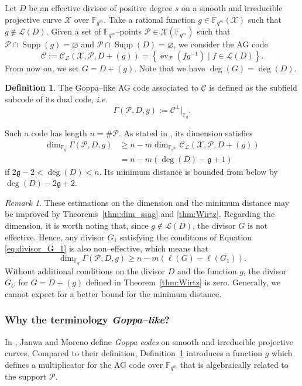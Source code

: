 \documentclass[journal]{IEEEtran}
\theoremstyle{plain}
\theoremstyle{definition}
\newtheorem{definition}[thm]{Definition}
\theoremstyle{remark}
\newtheorem{remark}[thm]{Remark}
\DeclareMathOperator{\ev}{ev}
\newcommand{\calP}{\mathcal{P}}
\newcommand{\calL}{\mathcal{L}}
\newcommand{\calC}{\mathcal{C}}
\newcommand{\calX}{\mathcal{X}}
\newcommand{\fqm}{\mathbb{F}_{q^m}}
\newcommand{\fq}{\mathbb{F}_{q}}
\newcommand{\set}[1]{\left\{#1\right\}}
\newcommand{\Supp}{\operatorname{Supp}}
\begin{document}
	Let $D$ be an effective divisor of positive degree $s$ on a smooth and irreducible projective curve $\calX$ over $\fqm$. Take a rational function $g \in \fqm(\calX)$ such that $g \notin \calL(D)$. Given a set of $\fqm$--points $\calP \in \calX(\fqm)$ such that $\calP \cap \Supp(g) = \varnothing$ and $\calP \cap \Supp(D) = \varnothing$, we consider the AG code
	\[\calC := \calC_{\calL}(\calX,\calP,D+(g))=\set{\ev_{\calP}(fg^{-1}) \mid f \in \calL(D)}.\]
	From now on, we set $G=D+(g)$. Note that we have $\deg(G)=\deg(D)$.
	\begin{definition} \label{def:Goppa--like_AG_code}
		The Goppa--like AG code associated to $\calC$ is defined as the subfield subcode of its dual code, \emph{i.e.}
		\[ \Gamma(\calP,D,g) := \calC^{\perp}|_{\fq}.\]
	\end{definition}%
	Such a code has length $n = \# \calP$. As stated in \cite[Theorem~1]{JM96}, its dimension satisfies 
	\[\begin{aligned}
		\dim_{\fq} \Gamma(\calP,D,g) 	&\geq n-m \dim_{\fqm} \calC_{\calL}(\calX,\calP,D+(g)) \\
										&=n-m(\deg (D) - \mathfrak{g} +1 )
	\end{aligned}\]
	if $2\mathfrak{g} - 2 < \deg (D) < n$. Its minimum distance is bounded from below by $\deg (D) - 2 \mathfrak{g} + 2$.
	
	\begin{remark}
		These estimations on the dimension and the minimum distance may be improved by Theorems~\ref{thm:dim_ssag} and \ref{thm:Wirtz}. Regarding the dimension, it is worth noting that, since $g \notin \calL(D)$, the divisor $G$ is not effective. Hence, any divisor $G_1$ satisfying the conditions of Equation \eqref{eq:divisor_G_1} is also non--effective, which means that
		\[	\dim_{\fq}  \Gamma(\calP,D,g) \geq 	n-m\left(\ell(G) - \ell(G_1)\right). \]
		Without additional conditions on the divisor $D$ and the function $g$, the divisor $G_U$ for $G=D+(g)$ defined in Theorem~\ref{thm:Wirtz} is zero. Generally, we cannot expect for a better bound for the minimum distance. 
	\end{remark}
	
	
	
	\subsubsection{Why the terminology \textit{Goppa--like}?}
	
	In \cite{JM96}, Janwa and Moreno define \emph{Goppa codes} on smooth and irreducible projective curves. Compared to their definition, Definition~\ref{def:Goppa--like_AG_code} introduces a function $g$ which defines a multiplicator for the AG code over $\fqm$ that is algebraically related to the support $\calP$.
	
\end{document}
